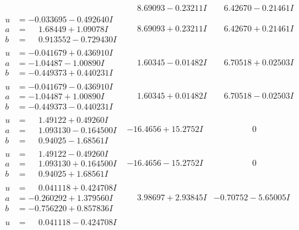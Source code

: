 \documentclass[1p]{elsarticle_modified}
\theoremstyle{definition}
\begin{document}
$$\begin{array}{c|c|c}
 & \phantom{-}8.69093 - 0.23211 I & \phantom{-}6.42670 - 0.21461 I \\ \hline\begin{aligned}
u &= -0.033695 - 0.492640 I \\
a &= \phantom{-}1.68449 + 1.09078 I \\
b &= \phantom{-}0.913552 - 0.729430 I\end{aligned}
 & \phantom{-}8.69093 + 0.23211 I & \phantom{-}6.42670 + 0.21461 I \\ \hline\begin{aligned}
u &= -0.041679 + 0.436910 I \\
a &= -1.04487 - 1.00890 I \\
b &= -0.449373 + 0.440231 I\end{aligned}
 & \phantom{-}1.60345 - 0.01482 I & \phantom{-}6.70518 + 0.02503 I \\ \hline\begin{aligned}
u &= -0.041679 - 0.436910 I \\
a &= -1.04487 + 1.00890 I \\
b &= -0.449373 - 0.440231 I\end{aligned}
 & \phantom{-}1.60345 + 0.01482 I & \phantom{-}6.70518 - 0.02503 I \\ \hline\begin{aligned}
u &= \phantom{-}1.49122 + 0.49260 I \\
a &= \phantom{-}1.093130 - 0.164500 I \\
b &= \phantom{-}0.94025 - 1.68561 I\end{aligned}
 & -16.4656 + 15.2752 I & \phantom{-0.000000 } 0 \\ \hline\begin{aligned}
u &= \phantom{-}1.49122 - 0.49260 I \\
a &= \phantom{-}1.093130 + 0.164500 I \\
b &= \phantom{-}0.94025 + 1.68561 I\end{aligned}
 & -16.4656 - 15.2752 I & \phantom{-0.000000 } 0 \\ \hline\begin{aligned}
u &= \phantom{-}0.041118 + 0.424708 I \\
a &= -0.260292 + 1.379560 I \\
b &= -0.756220 + 0.857836 I\end{aligned}
 & \phantom{-}3.98697 + 2.93845 I & -0.70752 - 5.65005 I \\ \hline\begin{aligned}
u &= \phantom{-}0.041118 - 0.424708 I \\

\end{aligned}
\end{array}$$
\end{document}
